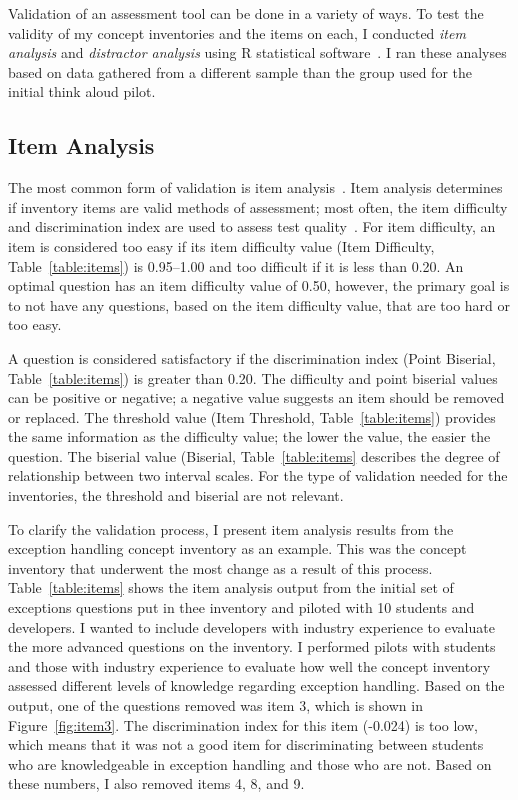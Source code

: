 Validation of an assessment tool can be done in a variety of ways.
To test the validity of my concept inventories and the items on each, I conducted \textit{item analysis} and \textit{distractor analysis} using R statistical software~\cite{boopathiraj2013analysis, RSoftware}. 
I ran these analyses based on data gathered from a different sample than the group used for the initial think aloud pilot. 

\subsection{Item Analysis}
The most common form of validation is item analysis~\cite{gorsuch1997exploratory}.
Item analysis determines if inventory items are valid methods of assessment; most often, the item difficulty and discrimination index are used to assess test quality~\cite{boopathiraj2013analysis}. For item difficulty, an item is considered too easy if its item difficulty value (Item Difficulty, Table~\ref{table:items}) is 0.95--1.00 and too difficult if it is less than 0.20. An optimal question has an item difficulty value of 0.50, however, the primary goal is to not have any questions, based on the item difficulty value, that are too hard or too easy. 

A question is considered satisfactory if the discrimination index (Point Biserial, Table~\ref{table:items}) is greater than 0.20. The difficulty and point biserial values can be positive or negative; a negative value suggests an item should be removed or replaced.
The threshold value (Item Threshold, Table~\ref{table:items}) provides the same information as the difficulty value; the lower the value, the easier the question. 
The biserial value (Biserial, Table~\ref{table:items} describes the degree of relationship between two interval scales. For the type of validation needed for the inventories, the threshold and biserial are not relevant.


To clarify the validation process, I present item analysis results from the exception handling concept inventory as an example. This was the concept inventory that underwent the most change as a result of this process. Table~\ref{table:items} shows the item analysis output from the initial set of exceptions questions put in thee inventory and piloted with 10 students and developers. I wanted to include developers with industry experience to evaluate the more advanced questions on the inventory. I performed pilots with students and those with industry experience to evaluate how well the concept inventory assessed different levels of knowledge regarding exception handling. Based on the output, one of the questions removed was item 3, which is shown in Figure~\ref{fig:item3}. The discrimination index for this item (-0.024) is too low, which means that it was not a good item for discriminating between students who are knowledgeable in exception handling and those who are not. Based on these numbers, I also removed items 4, 8, and 9.

